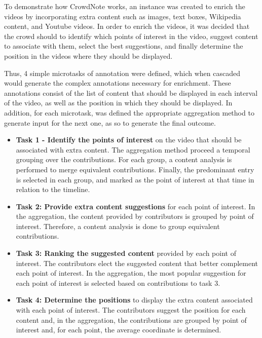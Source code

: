 To demonstrate how CrowdNote works, an instance was created to enrich the videos by incorporating extra content such as images, text boxes, Wikipedia content, and Youtube videos. In order to enrich the videos, it was decided that the crowd should to identify which points of interest in the video, suggest content to associate with them, select the best suggestions, and finally determine the position in the videos where they should be displayed.

Thus, 4 simple microtasks of annotation were defined, which when cascaded would generate the complex annotations necessary for enrichment. These annotations consist of the list of content that should be displayed in each interval of the video, as well as the position in which they should be displayed. In addition, for each microtask, was defined the appropriate aggregation method to generate input for the next one, as so to generate the final outcome.


\begin{itemize}
\item \textbf{Task 1 - Identify the points of interest} on the video that should be associated with extra content. The aggregation method proceed a temporal grouping over the contributions. For each group, a content analysis is performed to merge equivalent contributions. Finally, the predominant entry is selected in each group, and marked as the point of interest at that time in relation to the timeline.

\item \textbf{Task 2: Provide extra content suggestions} for each point of interest. In the aggregation, the content provided by contributors is grouped by point of interest. Therefore, a content analysis is done to group equivalent contributions.

\item \textbf{Task 3: Ranking the suggested content} provided by each point of interest. The contributors elect the suggested content that better complement each point of interest. In the aggregation, the most popular suggestion for each point of interest is selected based on contributions to task 3.
	
\item \textbf{Task 4: Determine the positions} to display the extra content associated with each point of interest. The contributors suggest the position for each content and, in the aggregation, the contributions are grouped by point of interest and, for each point, the average coordinate is determined.

\end{itemize}

